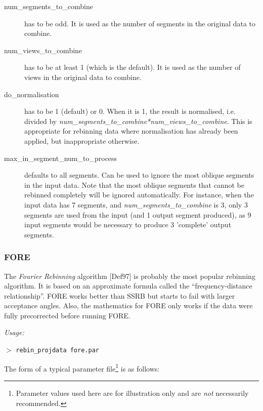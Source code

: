 \documentclass{article}
\newcommand{\cmdline}[1]{\par \noindent $>$ \texttt{#1}\par}
\begin{document}
\begin{description}
\item[num\_segments\_to\_combine] has to be odd. It is used as the 
number of segments in the original data to combine.
\item[num\_views\_to\_combine] has to be at least 1 (which 
is the default). It is used as the number of views in the original 
data to combine.
\item[do\_normalisation] has to be 1 (default) or 0. When it is 1, 
the result is normalised, i.e. divided by \textit{num\_segments\_to\_combine*num\_views\_to\_combine}. 
This is appropriate for rebinning data where normalisation has 
already been applied, but inappropriate otherwise.

\item[max\_in\_segment\_num\_to\_process] defaults to all segments. 
Can be used to ignore the most oblique segments in the input 
data. Note that the most oblique segments that cannot be rebinned 
completely will be ignored automatically. For instance, when 
the input data has 7 segments, and \textit{num\_segments\_to\_combine} is 
3, only 3 segments are used from the input (and 1 output segment 
produced), as 9 input segments would be necessary to produce 
3 'complete' output segments.
\end{description}

\subsubsection{
FORE}
\label{sec:FORE}
The \textit{Fourier Rebinning} algorithm [Def97] is probably the most popular
rebinning algorithm. It is based on an approximate formula called the
``frequency-distance relationship''. FORE works better than SSRB but starts
to fail with larger acceptance angles. Also, the mathematics
for FORE only works if the data were fully precorrected before running FORE.

\textit{Usage:}

\cmdline{rebin\_projdata fore.par}

The form of a typical parameter file\footnote{Parameter values used here are for
illustration only and are \textit{not} necessarily recommended.} is as follows:
\end{document}
